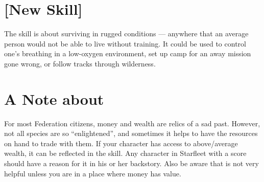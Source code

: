 \documentclass[12pt,titlepage,openany]{book}
\begin{document}
\begin{SkillActionList}



\end{SkillActionList}

\section{ [New Skill]}\label{sec:survival}

The  skill is about surviving in rugged conditions --- anywhere
that an average person would not be able to live without training. It could be
used to control one's breathing in a low-oxygen environment, set up camp for an
away mission gone wrong, or follow tracks through wilderness.

\begin{SkillActionList}



\end{SkillActionList}

\section{A Note about }\label{sec:note-resources}

For most Federation citizens, money and wealth are relics of a sad past.
However, not all species are so ``enlightened'', and sometimes it helps to have
the resources on hand to trade with them. If your character has access to
above\-/average wealth, it can be reflected in the  skill. Any
character in Starfleet with a  score should have a reason for
it in his or her backstory. Also be aware that  is not very
helpful unless you are in a place where money has value.
\end{document}
